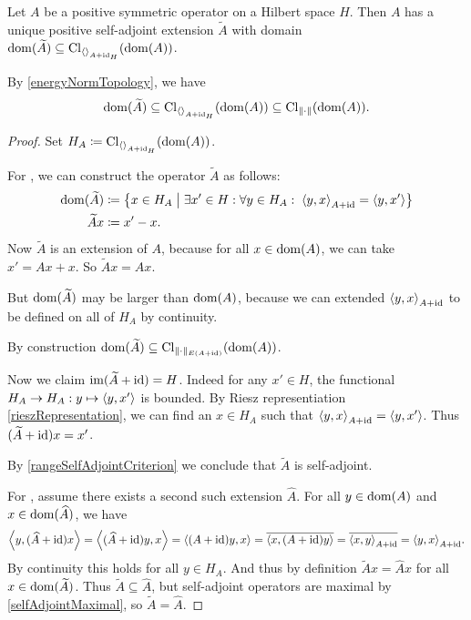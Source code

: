 \begin{theorem}
Let $A$ be a positive symmetric operator on a Hilbert space $H$. Then $A$ has a unique positive self-adjoint extension $\widetilde{A}$ with domain $\dom(\widetilde{A}) \subseteq \Closure_{\inner{}_{A+\id_H}}(\dom(A))$.
\end{theorem}
By \ref{energyNormTopology}, we have
\[ \dom(\widetilde{A}) \subseteq \Closure_{\inner{}_{A+\id_H}}(\dom(A)) \subseteq \Closure_{\norm{\cdot}}(\dom(A)). \]
\begin{proof}
Set $H_A \defeq \Closure_{\inner{}_{A+\id_H}}(\dom(A))$.

For , we can construct the operator $\widetilde{A}$ as follows:
\begin{align*}
\dom(\widetilde{A}) &\defeq \setbuilder{x\in H_A}{\exists x'\in H:\forall y\in H_A:\; \inner{y,x}_{A+\id} = \inner{y,x'}} \\
\widetilde{A}x &\defeq x' - x.
\end{align*}
Now $\widetilde{A}$ is an extension of $A$, because for all $x\in \operatorname{dom}(A)$, we can take $x' = Ax + x$. So $\widetilde{A}x = Ax$.

But $\operatorname{dom}(\widetilde{A})$ may be larger than $\operatorname{dom}(A)$, because we can extended $\inner{y,x}_{A+\id}$ to be defined on all of $H_A$ by continuity.

By construction $\operatorname{dom}(\widetilde{A}) \subseteq \operatorname{Cl}_{\lVert\cdot\rVert_{E(A+\operatorname{id})}}(\operatorname{dom}(A))$.

Now we claim $\operatorname{im}(\widetilde{A} + \operatorname{id}) = H$. Indeed for any $x'\in H$, the functional $H_A \to H_A: y\mapsto \inner{y,x'}$ is bounded. By Riesz representiation \ref{rieszRepresentation}, we can find an $x\in H_A$ such that $\inner{y,x}_{A+\id} = \inner{y,x'}$. Thus $(\widetilde{A} + \operatorname{id})x = x'$.

By \ref{rangeSelfAdjointCriterion} we conclude that $\widetilde{A}$ is self-adjoint. 

For , assume there exists a second such extension $\widehat{A}$. For all $y\in \operatorname{dom}(A)$ and $x\in \operatorname{dom}(\widehat{A})$, we have
\[ \inner{y, (\widehat{A}+\id)x} = \inner{(\widehat{A}+\id)y, x} = \inner{(A+\id)y, x} = \overline{\inner{x, (A+\id)y}} = \overline{\inner{x, y}_{A+\id}} = \inner{y, x}_{A+\id}. \]
By continuity this holds for all $y\in H_A$. And thus by definition $\widetilde{A}x = \widehat{A}x$ for all $x\in\operatorname{dom}(\widetilde{A})$. Thus $\widetilde{A} \subseteq \widehat{A}$, but self-adjoint operators are maximal by \ref{selfAdjointMaximal}, so $\widetilde{A} = \widehat{A}$.
\end{proof}

